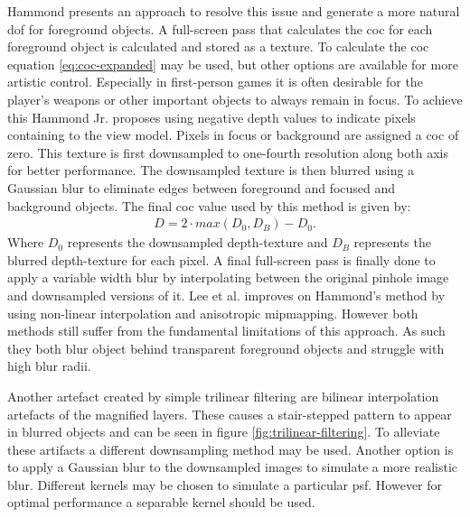 Hammond \cite{Hammon.2008} presents an approach to resolve this issue and generate a more natural \gls{dof} for foreground objects.
A full-screen pass that calculates the \gls{coc} for each foreground object is calculated and stored as a texture.
To calculate the \gls{coc} equation \ref{eq:coc-expanded} may be used, but other options are available for more artistic control.
Especially in first-person games it is often desirable for the player's weapons or other important objects to always remain in focus.
To achieve this Hammond Jr. proposes using negative depth values to indicate pixels containing to the view model.
Pixels in focus or background are assigned a \gls{coc} of zero.
This texture is first downsampled to one-fourth resolution along both axis for better performance.
The downsampled texture is then blurred using a Gaussian blur to eliminate edges between foreground and focused and background objects.
The final \gls{coc} value used by this method is given by:
\begin{align}
    D = 2 \cdot max(D_0, D_B) - D_0.
\end{align}
Where $D_0$ represents the downsampled depth-texture and $D_B$ represents the blurred depth-texture for each pixel.
A final full-screen pass is finally done to apply a variable width blur by interpolating between the original pinhole image and downsampled versions of it.
Lee et al. \cite{Lee.2009} improves on Hammond's method by using non-linear interpolation and anisotropic mipmapping.
However both methods still suffer from the fundamental limitations of this approach.
As such they both blur object behind transparent foreground objects and struggle with high blur radii.

Another artefact created by simple trilinear filtering are bilinear interpolation artefacts of the magnified layers.
These causes a stair-stepped pattern to appear in blurred objects and can be seen in figure \ref{fig:trilinear-filtering}.
To alleviate these artifacts a different downsampling method may be used.
Another option is to apply a Gaussian blur to the downsampled images to simulate a more realistic blur.
Different kernels may be chosen to simulate a particular \gls{psf}.
However for optimal performance a separable kernel should be used.\cite{Demers.2005, Gilham.2007}


